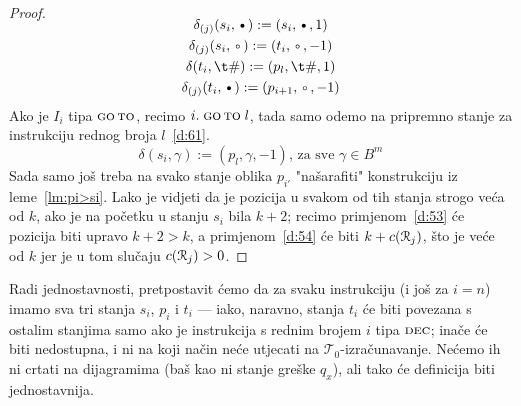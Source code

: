 \begin{proof}
\noindent\begin{gather}
\SwapAboveDisplaySkip
\label{d:51}
    \delta_{(j)}(s_i,\text\textbullet):=(s_i,\text\textbullet,1)\\
\label{d:52}
    \delta_{(j)}(s_i,\text\textopenbullet):=(t_i,\text\textopenbullet,-1)\\
\label{d:53}
    \delta(t_i,\t\#):=(p_l,\t\#,1)\\
\label{d:54}
    \delta_{(j)}(t_i,\text\textbullet):=(p_{i+1},\text\textopenbullet,-1)
\end{gather}
Ako je $I_i$ tipa $\textsc{go\,to}$, recimo $i.\;\textsc{go\,to}\;l$, tada samo odemo na pripremno stanje za instrukciju rednog broja $l$~\eqref{d:61}.
\begin{equation}
\label{d:61}
    \delta(s_i,\gamma):=(p_l,\gamma,-1)\text{, za sve $\gamma\in B^m$}
\end{equation}
Sada samo još treba na svako stanje oblika $p_{i'}$ "našarafiti" konstrukciju iz leme~\ref{lm:pi>si}. Lako je vidjeti da je pozicija u svakom od tih stanja strogo veća od $k$, ako je na početku u stanju $s_i$ bila $k+2$; recimo primjenom~\eqref{d:53} će pozicija biti upravo $k+2>k$, a primjenom~\eqref{d:54} će biti $k+c(\mathcal R_{j})$, što je veće od $k$ jer je u tom slučaju $c(\mathcal R_{j})>0$.
\end{proof}
Radi jednostavnosti, pretpostavit ćemo da za svaku instrukciju (i još za $i=n$) imamo sva tri stanja $s_i$, $p_i$ i $t_i$ --- iako, naravno, stanja $t_i$ će biti povezana s ostalim stanjima samo ako je instrukcija s rednim brojem $i$ tipa $\textsc{dec}$; inače će biti nedostupna, i ni na koji način neće utjecati na $\mathcal T_0$-izračunavanje. Nećemo ih ni crtati na dijagramima (baš kao ni stanje greške $q_x$), ali tako će definicija biti jednostavnija.

